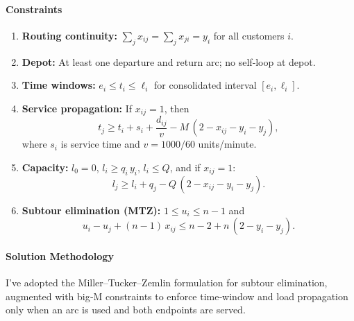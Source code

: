 \documentclass[a4paper,11pt]{article}
\begin{document}
\paragraph{Constraints}
\begin{enumerate}
  \item \textbf{Routing continuity:} \(\sum_j x_{ij}=\sum_j x_{ji}=y_i\) for all customers \(i\).  
  \item \textbf{Depot:} At least one departure and return arc; no self‐loop at depot.
  \item \textbf{Time windows:} \(e_i \le t_i \le \ell_i\) for consolidated interval \([e_i,\ell_i]\).
  \item \textbf{Service propagation:} If \(x_{ij}=1\), then 
    \[
      t_j \ge t_i + s_i + \frac{d_{ij}}{v} - M\,(2 - x_{ij} - y_i - y_j),
    \]
    where \(s_i\) is service time and \(v=1000/60\) units/minute.
  \item \textbf{Capacity:} \(l_0=0\), \(l_i \ge q_i\,y_i\), \(l_i \le Q\), and if \(x_{ij}=1\):
    \[
      l_j \ge l_i + q_j - Q\,(2 - x_{ij} - y_i - y_j).
    \]
  \item \textbf{Subtour elimination (MTZ):} \(1 \le u_i \le n-1\) and 
    \[
      u_i - u_j + (n-1)\,x_{ij} \le n-2 + n\,(2 - y_i - y_j).
    \]
\end{enumerate}

\paragraph{Solution Methodology}
I've adopted the Miller–Tucker–Zemlin formulation for subtour elimination, augmented with big‐M constraints to enforce time‐window and load propagation only when an arc is used and both endpoints are served.

\newpage
\end{document}
